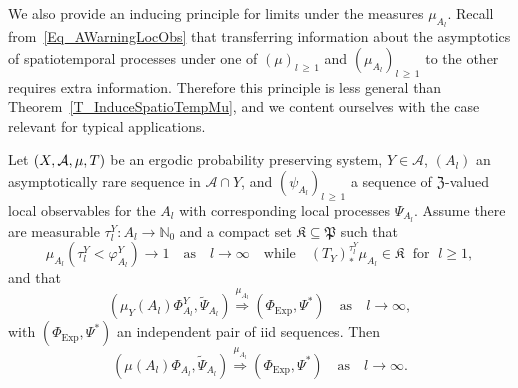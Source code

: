 \documentclass[AHL,Unicode,longabstracts]{cedram}
\newcommand{\clA}{\mathcal{A}}
\newcommand{\Expl}{\mathrm{Exp}}
\newcommand{\frkK}{\mathfrak{K}}
\newcommand{\frkP}{\mathfrak{P}}
\newcommand{\frkZ}{\mathfrak{Z}}
\newcommand{\bbN}{\mathbb{N}}
\begin{document}
We also provide an inducing principle for limits under the measures $\mu_{A_{l}}$. Recall from~\eqref{Eq_AWarningLocObs} that transferring information about the asymptotics of spatiotemporal processes under one of $(\mu)_{l\,\geq\,1}$ and $(\mu_{A_{l}})_{l\,\geq\,1}$ to the other requires extra information. Therefore this principle is less general than Theorem~\ref{T_InduceSpatioTempMu}, and we content ourselves with the case relevant for typical applications.

\begin{prop}\label{P_InduceSpatioTempFromAl}
Let $(X,\clA,\linebreak\mu,T)$ be an ergodic probability preserving system, $Y\in\clA$, $(A_{l})$ an asymptotically rare sequence in $\clA\cap Y$, and $(\psi_{A_{l}})_{l\,\geq\,1}$ a sequence of $\frkZ$-valued local observables for the $A_{l}$ with corresponding local processes $\Psi_{A_{l}}$. Assume there are measurable $\tau_{l} ^{Y}:A_{l}\rightarrow\bbN_{0}$ and a compact set $\frkK
\subseteq\frkP$ such that
\begin{equation}\label{Eq_xcxcxcxc}
\mu_{A_{l}}\left(\tau_{l}^{Y}<\varphi_{A_{l}}^{Y}\right) \longrightarrow 1\quad\text{as}\quad l\rightarrow\infty\quad\text{while}\quad(T_{Y})_{\ast}^{\tau _{l}^{Y}}\mu_{A_{l}}\in\frkK\;\text{ for }\;l\geq1,
\end{equation}
and that
\begin{equation}\label{Eq_xcxcxcxcx}
\left(\mu_{Y}(A_{l})\Phi_{A_{l}}^{Y},\widetilde{\Psi}_{A_{l}}\right)\overset{\mu_{A_{l}}}{\Longrightarrow}\left(\Phi_{\Expl},\Psi^{\ast}\right)\quad\text{as}\quad l\rightarrow\infty, 
\end{equation}
with $(\Phi_{\Expl},\Psi^{\ast})$ an independent pair of iid sequences. Then
\begin{equation}\label{Eq_khkhkhkkhhkhkhk}
\left(\mu(A_{l})\Phi_{A_{l}},\widetilde{\Psi}_{A_{l}}\right)\overset{\mu_{A_{l}}}{\Longrightarrow}\left(\Phi_{\Expl},\Psi^{\ast}\right)\quad\text{as}\quad l\rightarrow\infty. 
\end{equation}
\end{prop}
\end{document}
